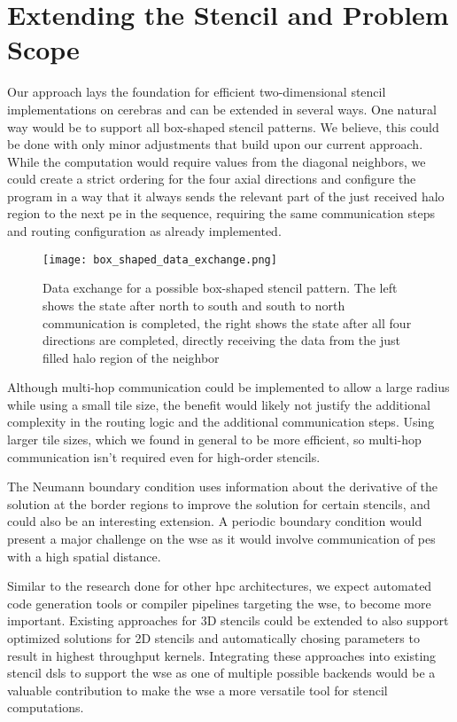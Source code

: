 \section{Extending the Stencil and Problem Scope}
Our approach lays the foundation for efficient two-dimensional stencil implementations on cerebras and can be extended in several ways.
One natural way would be to support all box-shaped stencil patterns.
We believe, this could be done with only minor adjustments that build upon our current approach.
While the computation would require values from the diagonal neighbors, we could create a strict ordering for the four axial directions and configure the program in a way that it always sends the relevant part of the just received halo region to the next \ac{pe} in the sequence, requiring the same communication steps and routing configuration as already implemented.

\begin{figure}[h]
    \centering
    \texttt{[image: box\_shaped\_data\_exchange.png]}
    \caption{Data exchange for a possible box-shaped stencil pattern. The left shows the state after north to south and south to north communication is completed, the right shows the state after all four directions are completed, directly receiving the data from the just filled halo region of the neighbor}
    \label{fig:data_exchange_box_shaped}
\end{figure}

Although multi-hop communication could be implemented to allow a large radius while using a small tile size, the benefit would likely not justify the additional complexity in the routing logic and the additional communication steps. Using larger tile sizes, which we found in general to be more efficient, so multi-hop communication isn't required even for high-order stencils.

The Neumann boundary condition uses information about the derivative of the solution at the border regions to improve the solution for certain stencils, and could also be an interesting extension. A periodic boundary condition would present a major challenge on the \ac{wse} as it would involve communication of \acp{pe} with a high spatial distance. 

Similar to the research done for other \ac{hpc} architectures, we expect automated code generation tools or compiler pipelines targeting the \ac{wse}, to become more important.
Existing approaches for 3D stencils\cite{sai2024automated} could be extended to also support optimized solutions for 2D stencils and automatically chosing parameters to result in highest throughput kernels.
Integrating these approaches into existing stencil \acp{dsl} to support the \ac{wse} as one of multiple possible backends would be a valuable contribution to make the \ac{wse} a more versatile tool for stencil computations.


